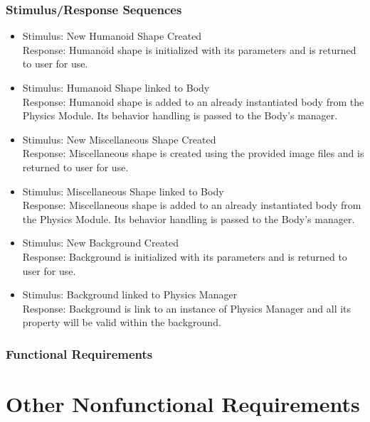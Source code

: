 \documentclass{scrreprt}
\begin{document}
\subsection{Stimulus/Response Sequences}
\begin{itemize}

\item Stimulus:		New Humanoid Shape Created\\
Response: 		Humanoid shape is initialized with its parameters and is returned to user for use.\\

\item Stimulus: 		Humanoid Shape linked to Body\\
Response:	           Humanoid shape is added to an already instantiated body from the Physics Module. Its behavior handling is passed to the Body's manager.\\

\item Stimulus:		New Miscellaneous Shape Created\\
Response: 		Miscellaneous shape is created using the provided image files and is returned to user for use.\\

\item Stimulus:		Miscellaneous Shape linked to Body\\
Response: 		Miscellaneous shape is added to an already instantiated body from the Physics Module. Its behavior handling is passed to the Body's manager.\\

\item Stimulus:		New Background Created\\
Response: 		Background is initialized with its parameters and is returned to user for use.\\

\item Stimulus:		Background linked to Physics Manager\\
Response: 		Background is link to an instance of Physics Manager and all its property will be valid within the background.\\

\end{itemize}
\subsection{Functional Requirements}


\chapter{Other Nonfunctional Requirements}
\end{document}
